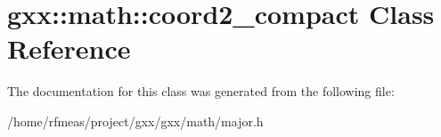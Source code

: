 \hypertarget{classgxx_1_1math_1_1coord2__compact}{}\section{gxx\+:\+:math\+:\+:coord2\+\_\+compact Class Reference}
\label{classgxx_1_1math_1_1coord2__compact}


The documentation for this class was generated from the following file\+:\begin{DoxyCompactItemize}
\item 
/home/rfmeas/project/gxx/gxx/math/major.\+h\end{DoxyCompactItemize}

